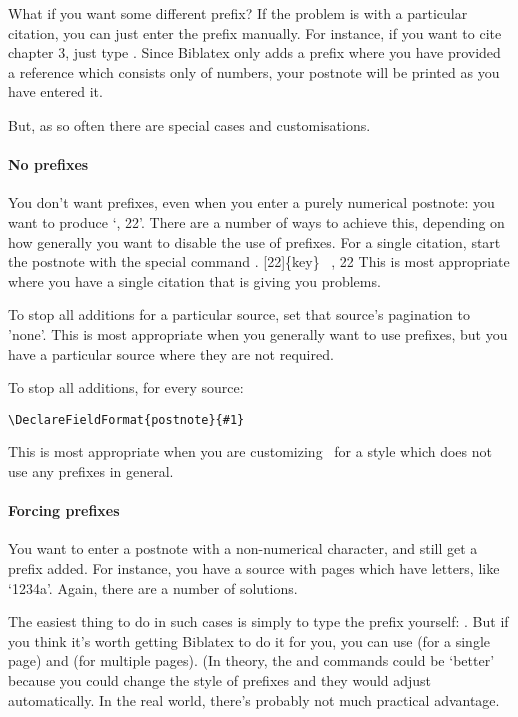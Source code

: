 What if you want some different prefix? If the problem is with a
particular citation, you can just enter the prefix manually. For
instance, if you want to cite chapter 3, just type
. Since Biblatex only adds a prefix where you have
provided a reference which consists only of numbers, your postnote
will be printed as you have entered it.



 But, as so often there are special cases and
customisations.


\paragraph{No prefixes} You don't want prefixes, even when you enter a
purely numerical postnote: you want  to produce `,
22'. There are a number of ways to achieve this, depending on how
generally you want to disable the use of prefixes.  For a single
citation, start the postnote with the special command .
\marginnote
{{\ttfamily
{}[22]\{key\}} \gives\ , 22}
This is most appropriate where you have a single citation that is
giving you problems.

To
 stop all additions for a particular source, set that source’s
pagination to ’none’. This is most appropriate when you generally want
to use prefixes, but you have a particular source where they are not required.

To stop all additions, for every source:
\begin{center}
\verb|\DeclareFieldFormat{postnote}{#1}|
\end{center}
This is most appropriate when you are customizing \biblatex\ for a
style which does not use any prefixes in general.

\paragraph{Forcing prefixes} You want to enter a postnote with a
non-numerical character, and still get a prefix added. For instance,
you have a source with pages which have letters, like `1234a'. Again,
there are a number of solutions.

The easiest thing to do in such cases is simply to type the prefix
yourself: \cs{cite[p.\textasciitilde 1234a]\{key\}}. But if you think
it’s worth getting Biblatex to do it for you, you can use
(for a single page) and  (for multiple pages). (In theory, the
\cs{pno} and \cs{ppno} commands could be `better' because you could
change the style of prefixes and they would adjust automatically. In
the real world, there's probably not much practical advantage.

